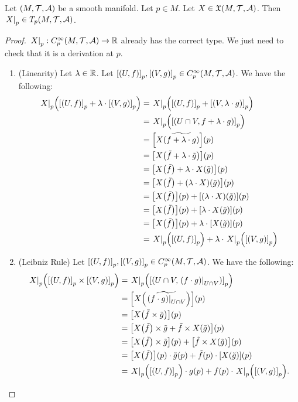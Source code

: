 \documentclass[11pt,reqno]{amsart}
\begin{document}
\begin{lemma}\label{lem:Xp-derivation}
Let $(M,\mathcal{T},\mathcal{A})$ be a smooth manifold. Let $p\in M$.
Let $X\in\mathfrak{X}(M,\mathcal{T},\mathcal{A})$. Then $\eval{X}_p\in T_p(M,\T,\A)$.
\end{lemma}
\begin{proof}
$\eval{X}_p:C_p^\infty(M,\T,\A)\to\R$ already has the correct type. We just need to check
that it is a derivation at $p$.
\begin{enumerate}
\item (Linearity)
Let $\lambda\in\mathbb{R}$. Let ${\SqBr{(U,f)}}_p,{\SqBr{(V,g)}}_p\in C_p^\infty(M,\T,\A)$.
We have the following:
\[\begin{aligned}
\eval{X}_p\Br{\SqBr{(U,f)}_p+\lambda\cdot\SqBr{(V,g)}_p}
&=\eval{X}_p\Br{\SqBr{(U,f)}_p+\SqBr{(V,\lambda\cdot g)}_p}\\
&=\eval{X}_p\Br{\SqBr{\Br{U\cap V,f+\lambda\cdot g}}_p}\\
&=\FUNC{X\widetilde{\Br{f+\lambda\cdot g}}}{p}\\
&=\FUNC{X\Br{\tilde f+\lambda\cdot\tilde g}}{p}\\
&=\FUNC{X\Br{\tilde f}+\lambda\cdot X\Br{\tilde g}}{p}\\
&=\FUNC{X\Br{\tilde f}+\Func{\lambda\cdot X}{\tilde g}}{p}\\
&=\FUNC{X\Br{\tilde f}}{p}+\FUNC{\Func{\lambda\cdot X}{\tilde g}}{p}\\
&=\FUNC{X\Br{\tilde f}}{p}+\FUNC{\lambda\cdot X\Br{\tilde g}}{p}\\
&=\FUNC{X\Br{\tilde f}}{p}+\lambda\cdot \FUNC{X\Br{\tilde g}}{p}\\
&=\eval{X}_p\Br{\SqBr{(U,f)}_p}+\lambda\cdot \eval{X}_p\Br{\SqBr{(V,g)}_p}
\end{aligned}\]

\item (Leibniz Rule)
Let ${\SqBr{(U,f)}}_p,{\SqBr{(V,g)}}_p\in C_p^\infty(M,\T,\A)$.
We have the following:
\[\begin{aligned}
\eval{X}_p\Br{\SqBr{(U,f)}_p\times\SqBr{(V,g)}_p}
&=\eval{X}_p\Br{\SqBr{\Br{U\cap V,\eval{\Br{f\cdot g}}_{U\cap V}}}_p}\\
&=\FUNC{X\Br{\widetilde{\eval{\Br{f\cdot g}}_{U\cap V}}}}{p}\\
&=\FUNC{X\Br{\tilde f\times\tilde g}}{p}\\
&=\FUNC{X\Br{\tilde f}\times\tilde g+\tilde f\times X\Br{\tilde g}}{p}\\
&=\FUNC{X\Br{\tilde f}\times\tilde g}{p}
+\FUNC{\tilde f\times X\Br{\tilde g}}{p}\\
&=\FUNC{X\Br{\tilde f}}{p}\cdot\tilde g(p)+
\tilde f(p)\cdot\FUNC{X\Br{\tilde g}}{p}\\
&=\eval{X}_p\Br{\SqBr{(U,f)}_p}\cdot g(p)+
f(p)\cdot \eval{X}_p\Br{\SqBr{(V,g)}_p}.\\
\end{aligned}\]

\end{enumerate}
\end{proof}
\end{document}
